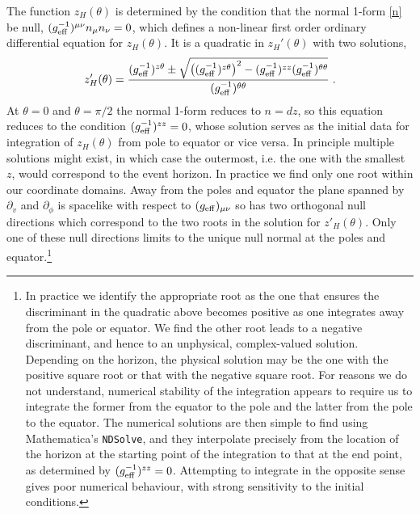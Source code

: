 \documentclass[12pt]{article}
\numberwithin{equation}{section}
\begin{document}
The function $z_H(\theta)$ is determined by 
the condition that the normal 1-form \eqref{n} be null, 
$(g^{-1}_{\rm eff})^{\mu\nu} n_\mu n_\nu = 0$,
which defines a non-linear first order ordinary differential equation for $z_H(\theta)$. It is a quadratic in $z_H'(\theta)$ with two solutions,
\begin{equation}
    z'_H(\theta) = \frac{ (g^{-1}_{\rm eff})^{z\theta} \pm \sqrt{ \left( (g^{-1}_{\rm eff})^{z\theta} \right)^2 - (g^{-1}_{\rm eff})^{zz} (g^{-1}_{\rm eff})^{\theta\theta}}  }{ (g^{-1}_{\rm eff})^{\theta\theta}  } \; .
\end{equation}
%
At $\theta=0$ and $\theta=\pi/2$ the normal 1-form
reduces to $n = dz$, so
this equation reduces to the condition $(g^{-1}_{\rm eff})^{zz} = 0$, 
whose solution serves as the initial data for integration
of $z_H(\theta)$ from pole to equator or vice versa. 
In principle multiple solutions might exist, 
in which case the outermost, i.e. the one with the smallest $z$, would correspond to the event horizon. 
In practice we find only one root within our coordinate domains.
Away from the poles and equator 
the plane spanned by $\partial_v$ and $\partial_\phi$  is spacelike with respect to $(g_{\rm eff})_{\mu\nu}$ so
has two orthogonal null directions
which correspond to the two roots in the solution for  $z'_H(\theta)$. 
Only one of these null directions limits to 
the unique null normal at the poles and equator.\footnote{In practice we identify the appropriate root as the one that ensures the discriminant in the quadratic above becomes positive as one integrates away from the pole or equator. We find the other root leads to a negative discriminant, and hence to 
an unphysical, complex-valued solution.
Depending on the horizon, the physical solution may be the one with the positive square root or that
with the negative square root. 
For reasons we do not understand, numerical stability of the integration appears to require us to integrate the 
former from the equator to the pole and the latter from the pole to the equator.
The numerical solutions are then simple to find using Mathematica's {\tt NDSolve}, and they interpolate precisely from the location of the horizon at the starting point of the integration to that at the end point, as determined by $(g^{-1}_{\rm eff})^{zz} = 0$. Attempting to integrate in the opposite sense gives poor numerical behaviour, with strong sensitivity to the initial conditions.
}
\end{document}
